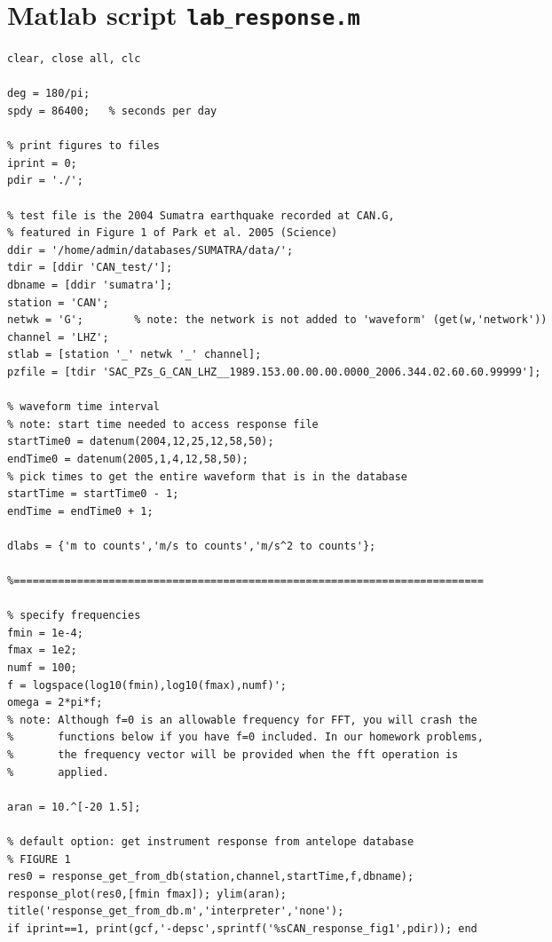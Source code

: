\documentclass[11pt,titlepage,fleqn]{article}
\newcommand{\tfile}{{\tt lab$\_$response.m}}
\begin{document}
\pagebreak



\appendix

\section{Matlab script \tfile}
\label{sec:script}

\footnotesize
\begin{spacing}{1.0}
\begin{verbatim}
clear, close all, clc

deg = 180/pi;
spdy = 86400;   % seconds per day

% print figures to files
iprint = 0;
pdir = './';

% test file is the 2004 Sumatra earthquake recorded at CAN.G,
% featured in Figure 1 of Park et al. 2005 (Science)
ddir = '/home/admin/databases/SUMATRA/data/';
tdir = [ddir 'CAN_test/'];
dbname = [ddir 'sumatra'];
station = 'CAN';
netwk = 'G';        % note: the network is not added to 'waveform' (get(w,'network'))
channel = 'LHZ';
stlab = [station '_' netwk '_' channel];
pzfile = [tdir 'SAC_PZs_G_CAN_LHZ__1989.153.00.00.00.0000_2006.344.02.60.60.99999'];

% waveform time interval
% note: start time needed to access response file
startTime0 = datenum(2004,12,25,12,58,50);
endTime0 = datenum(2005,1,4,12,58,50);
% pick times to get the entire waveform that is in the database
startTime = startTime0 - 1;
endTime = endTime0 + 1;

dlabs = {'m to counts','m/s to counts','m/s^2 to counts'};

%==========================================================================

% specify frequencies
fmin = 1e-4;
fmax = 1e2;
numf = 100;
f = logspace(log10(fmin),log10(fmax),numf)';
omega = 2*pi*f;
% note: Although f=0 is an allowable frequency for FFT, you will crash the
%       functions below if you have f=0 included. In our homework problems,
%       the frequency vector will be provided when the fft operation is
%       applied.

aran = 10.^[-20 1.5];

% default option: get instrument response from antelope database
% FIGURE 1
res0 = response_get_from_db(station,channel,startTime,f,dbname);
response_plot(res0,[fmin fmax]); ylim(aran);
title('response_get_from_db.m','interpreter','none');
if iprint==1, print(gcf,'-depsc',sprintf('%sCAN_response_fig1',pdir)); end


\end{verbatim}
\end{spacing}
\end{document}
